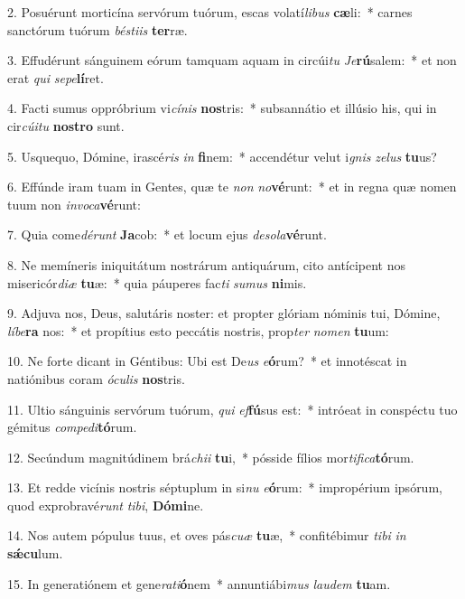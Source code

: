 2. Posuérunt morticína servórum tuórum, escas volatí\textit{li}\textit{bus} \textbf{cæ}li:~*  carnes sanctórum tuórum \textit{bés}\textit{ti}\textit{is} \textbf{ter}ræ.\

3. Effudérunt sánguinem eórum tamquam aquam in circúi\textit{tu} \textit{Je}\textbf{rú}salem:~*  et non erat \textit{qui} \textit{se}\textit{pe}\textbf{lí}ret.\

4. Facti sumus oppróbrium vi\textit{cí}\textit{nis} \textbf{nos}tris:~*  subsannátio et illúsio his, qui in cir\textit{cú}\textit{i}\textit{tu} \textbf{nos}\textbf{tro} sunt.\

5. Usquequo, Dómine, irascé\textit{ris} \textit{in} \textbf{fi}nem:~*  accendétur velut i\textit{gnis} \textit{ze}\textit{lus} \textbf{tu}us?\

6. Effúnde iram tuam in Gentes, quæ te \textit{non} \textit{no}\textbf{vé}runt:~*  et in regna quæ nomen tuum non \textit{in}\textit{vo}\textit{ca}\textbf{vé}runt:\

7. Quia come\textit{dé}\textit{runt} \textbf{Ja}cob:~*  et locum ejus \textit{de}\textit{so}\textit{la}\textbf{vé}runt.\

8. Ne memíneris iniquitátum nostrárum antiquárum, cito antícipent nos misericór\textit{di}\textit{æ} \textbf{tu}æ:~*  quia páuperes fac\textit{ti} \textit{su}\textit{mus} \textbf{ni}mis.\

9. Adjuva nos, Deus, salutáris noster: et propter glóriam nóminis tui, Dómine, \textit{lí}\textit{be}\textbf{ra} nos:~*  et propítius esto peccátis nostris, prop\textit{ter} \textit{no}\textit{men} \textbf{tu}um:\

10. Ne forte dicant in Géntibus: Ubi est De\textit{us} \textit{e}\textbf{ó}rum?~*  et innotéscat in natiónibus coram \textit{ó}\textit{cu}\textit{lis} \textbf{nos}tris.\

11. Ultio sánguinis servórum tuórum, \textit{qui} \textit{ef}\textbf{fú}sus est:~*  intróeat in conspéctu tuo gémitus \textit{com}\textit{pe}\textit{di}\textbf{tó}rum.\

12. Secúndum magnitúdinem brá\textit{chi}\textit{i} \textbf{tu}i,~*  pósside fílios mor\textit{ti}\textit{fi}\textit{ca}\textbf{tó}rum.\

13. Et redde vicínis nostris séptuplum in si\textit{nu} \textit{e}\textbf{ó}rum:~*  impropérium ipsórum, quod exprobravé\textit{runt} \textit{ti}\textit{bi}, \textbf{Dó}\textbf{mi}ne.\

14. Nos autem pópulus tuus, et oves pás\textit{cu}\textit{æ} \textbf{tu}æ,~*  confitébimur \textit{ti}\textit{bi} \textit{in} \textbf{sǽ}\textbf{cu}lum.\

15. In generatiónem et gene\textit{ra}\textit{ti}\textbf{ó}nem~*  annuntiábi\textit{mus} \textit{lau}\textit{dem} \textbf{tu}am.\

